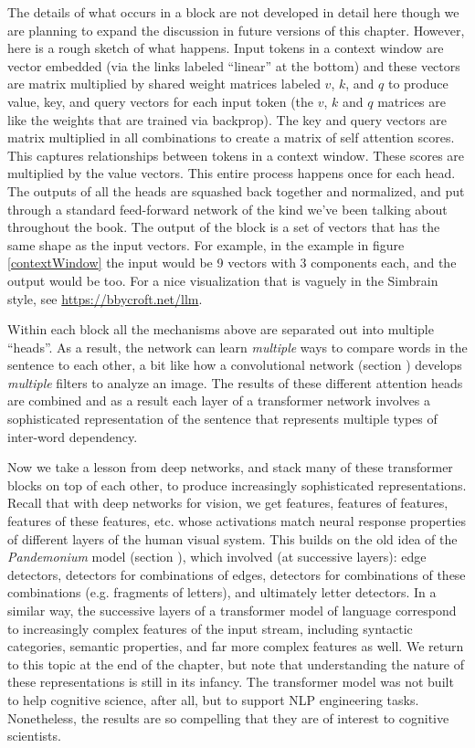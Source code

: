The details of what occurs in a block are not developed in detail here though we are planning to expand the discussion in future versions of this chapter. However, here is a rough sketch of what happens. Input tokens in a context window are vector embedded (via the links labeled ``linear'' at the bottom) and these vectors are matrix multiplied by shared weight matrices labeled $v$, $k$, and $q$ to produce value, key, and query vectors for each input token (the $v$, $k$ and $q$ matrices are like the weights that are trained via backprop). The key and query vectors are matrix multiplied in all combinations to create a matrix of self attention scores. This captures relationships between tokens in a context window. These scores are multiplied by the value vectors. This entire process happens once for each head. The outputs of all the heads are squashed back together and normalized, and put through a standard feed-forward network of the kind we've been talking about throughout the book. The output of the block is a set of vectors that has the same shape as the input vectors.  For example, in the example in figure \ref{contextWindow} the input would be 9 vectors with 3 components each, and the output would be too. For a nice visualization that is vaguely in the Simbrain style, see \url{https://bbycroft.net/llm}.

Within each block all the mechanisms above are separated out into multiple ``heads''. As a result, the network can learn \emph{multiple} ways to compare words in the sentence to each other, a bit like how a convolutional network (section ) develops \emph{multiple} filters to analyze an image.  The results of these different attention heads are combined and as a result each layer of a transformer network involves a sophisticated representation of the sentence that represents multiple types of inter-word dependency.

Now we take a lesson from deep networks, and stack many of these transformer blocks on top of each other, to produce increasingly sophisticated representations.  Recall that with deep networks for vision, we get features, features of features, features of these features, etc. whose activations match neural response properties of different layers of the human visual system. This builds on the old idea of the \emph{Pandemonium} model (section ), which involved (at successive layers): edge detectors, detectors for combinations of edges, detectors for combinations of these combinations (e.g. fragments of letters), and ultimately letter detectors. In a similar way, the successive layers of a transformer model of language correspond to increasingly complex features of the input stream, including syntactic categories, semantic properties, and far more complex features as well. We return to this topic at the end of the chapter, but note that understanding the nature of these representations is still in its infancy. The transformer model was not built to help cognitive science, after all, but to support NLP engineering tasks. Nonetheless, the results are so compelling that they are of interest to cognitive scientists.

